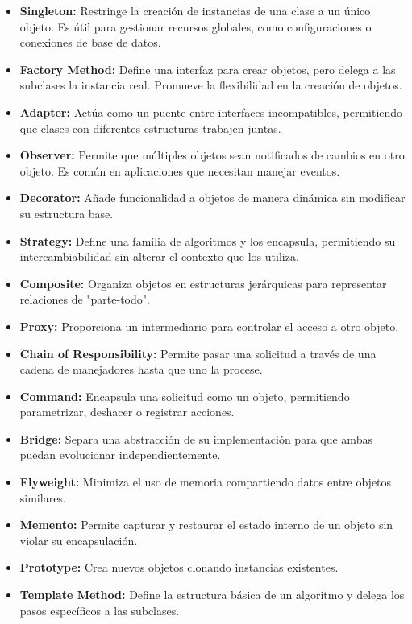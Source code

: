 \documentclass{article}
\begin{document}
\begin{itemize}
    \item \textbf{Singleton:} Restringe la creación de instancias de una clase a un único objeto. Es útil para gestionar recursos globales, como configuraciones o conexiones de base de datos.
    \item \textbf{Factory Method:} Define una interfaz para crear objetos, pero delega a las subclases la instancia real. Promueve la flexibilidad en la creación de objetos.
    \item \textbf{Adapter:} Actúa como un puente entre interfaces incompatibles, permitiendo que clases con diferentes estructuras trabajen juntas.
    \item \textbf{Observer:} Permite que múltiples objetos sean notificados de cambios en otro objeto. Es común en aplicaciones que necesitan manejar eventos.
    \item \textbf{Decorator:} Añade funcionalidad a objetos de manera dinámica sin modificar su estructura base.
    \item \textbf{Strategy:} Define una familia de algoritmos y los encapsula, permitiendo su intercambiabilidad sin alterar el contexto que los utiliza.
    \item \textbf{Composite:} Organiza objetos en estructuras jerárquicas para representar relaciones de "parte-todo".
    \item \textbf{Proxy:} Proporciona un intermediario para controlar el acceso a otro objeto.
    \item \textbf{Chain of Responsibility:} Permite pasar una solicitud a través de una cadena de manejadores hasta que uno la procese.
    \item \textbf{Command:} Encapsula una solicitud como un objeto, permitiendo parametrizar, deshacer o registrar acciones.
    \item \textbf{Bridge:} Separa una abstracción de su implementación para que ambas puedan evolucionar independientemente.
    \item \textbf{Flyweight:} Minimiza el uso de memoria compartiendo datos entre objetos similares.
    \item \textbf{Memento:} Permite capturar y restaurar el estado interno de un objeto sin violar su encapsulación.
    \item \textbf{Prototype:} Crea nuevos objetos clonando instancias existentes.
    \item \textbf{Template Method:} Define la estructura básica de un algoritmo y delega los pasos específicos a las subclases.
\end{itemize}
\end{document}
